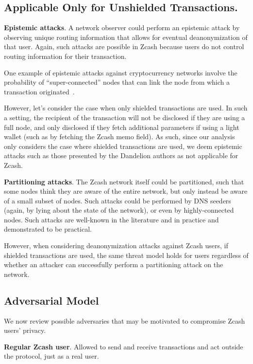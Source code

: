 \documentclass{article}
\begin{document}
\subsection{Applicable Only for Unshielded Transactions.}

\textbf{Epistemic attacks}. A network observer could perform an epistemic
attack by observing unique routing information that allows for eventual
deanonymization of that user. Again, such attacks are possible in Zcash because
users do not control routing information for their transaction.

One example of epistemic attacks against cryptocurrency networks involve the
probability of ``super-connected'' nodes that can link the node from which a
transaction originated~\cite{dandelion, fanti2018dandelion}.

However, let's consider the case when only shielded transactions are used. In
such a setting, the recipient of the transaction will not be disclosed if they
are using a full node, and only disclosed if they fetch additional parameters
if using a light wallet (such as by fetching the Zcash memo field). As such,
since our analysis only considers the case where shielded transactions are
used, we deem epistemic attacks such as those presented by the Dandelion
authors as not applicable for Zcash.

\textbf{Partitioning attacks}. The Zcash network itself could be partitioned,
such that some nodes think they are aware of the entire network, but only
instead be aware of a small subset of nodes. Such attacks could be performed by
DNS seeders (again, by lying about the state of the network), or even by
highly-connected nodes. Such attacks are well-known in the literature and in
practice and demonstrated to be practical.

However, when considering deanonymization attacks against Zcash users, if
shielded transactions are used, the same threat model holds for users
regardless of whether an attacker can successfully perform a partitioning
attack on the network.


\subsection{Adversarial Model}

We now review possible adversaries that may be motivated to compromise Zcash users'
privacy.

\textbf{Regular Zcash user}. Allowed to send and receive transactions and act
outside the protocol, just as a real user.
\end{document}
